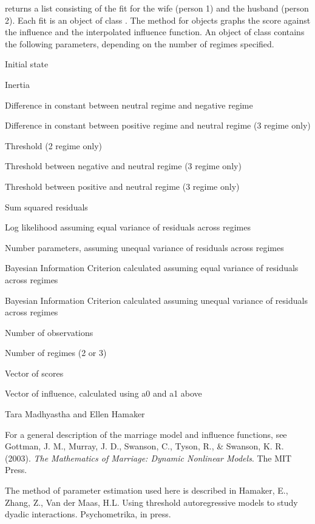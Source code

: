 \documentclass[a4paper]{book}
\begin{document}
\begin{Value}
 returns a list consisting of the fit for the
wife (person 1) and the husband (person 2). Each fit is an
object of class .
The  method for  objects graphs the
score against the influence and the interpolated influence
function. 
An object of class  contains the
following parameters, depending on the number of regimes specified.
\begin{ldescription}
\item[\code{a0}] Initial state
\item[\code{a1}] Inertia
\item[\code{l1}] Difference in constant between neutral regime and negative
regime
\item[\code{l2}] Difference in constant between positive regime and neutral
regime (3 regime only)
\item[\code{th}] Threshold (2 regime only)
\item[\code{nth}] Threshold between negative and neutral regime (3 regime only)
\item[\code{pth}] Threshold between positive and neutral regime (3 regime only)
\item[\code{ss}] Sum squared residuals
\item[\code{loglik}] Log likelihood assuming equal variance of residuals
across regimes
\item[\code{nparams}] Number parameters, assuming unequal variance of
residuals across regimes
\item[\code{BICeq}] Bayesian Information Criterion calculated assuming equal
variance of residuals across regimes
\item[\code{BICneq}] Bayesian Information Criterion calculated assuming unequal
variance of residuals across regimes
\item[\code{nt}] Number of observations
\item[\code{nregime}] Number of regimes (2 or 3)
\item[\code{score}] Vector of scores
\item[\code{influence}] Vector of influence, calculated using a0 and a1 above
\end{ldescription}
\end{Value}
\begin{Author}\relax
Tara Madhyastha and Ellen Hamaker
\end{Author}
\begin{References}\relax
For a general description of the marriage model and influence functions, see
Gottman, J. M., Murray, J. D., Swanson, C., Tyson, R., \& Swanson, K. R. (2003). \emph{The Mathematics of Marriage: Dynamic Nonlinear Models}. The MIT Press.

The method of parameter estimation used here is described in
Hamaker, E., Zhang, Z., Van der Maas, H.L. Using threshold autoregressive models to study dyadic interactions. Psychometrika, in press.
\end{References}
\end{document}
